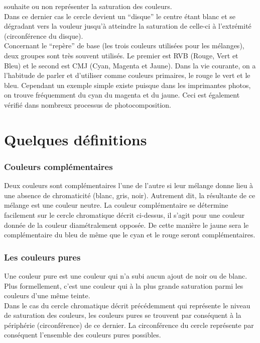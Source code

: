 \documentclass[french,a4paper]{report}
\begin{document}
{souhaite ou non représenter la saturation des
couleurs.\\
Dans ce dernier cas le cercle devient un \enquote{disque} le centre étant
blanc et se dégradant vers la vouleur jusqu'à atteindre la saturation
de celle-ci à l'extrémité (circonférence du
disque).\\
Concernant le \enquote{repère} de base (les trois couleurs utilisées
pour les mélanges), deux groupes sont très souvent utilisés. Le
premier est RVB (Rouge, Vert et Bleu) et le second est CMJ (Cyan,
Magenta et Jaune). Dans la vie courante, on a l'habitude de parler et
d'utiliser comme couleurs primaires, le rouge le vert et le bleu.
Cependant un exemple simple existe puisque dans les imprimantes
photos, on trouve fréquemment du cyan du magenta et du
jaune. Ceci est également vérifié dans nombreux processus de photocomposition.
\section{Quelques définitions}
\subsubsection{Couleurs complémentaires}
Deux couleurs sont complémentaires l'une de l'autre si leur mélange
donne lieu à une absence de chromaticité (blanc, gris,
noir). Autrement dit, la résultante de ce mélange est une couleur
neutre. La couleur complémentaire se détermine facilement sur le
cercle chromatique décrit ci-dessus, il s'agit pour une couleur donnée
de la couleur diamétralement opposée. De cette manière le jaune sera
le complémentaire du bleu de même que le cyan et le rouge seront
complémentaires.
\\
\subsubsection{Les couleurs pures}
Une couleur pure est une couleur qui n'a subi aucun ajout de noir ou
de blanc. Plus formellement, c'est une couleur qui à la plus grande
saturation parmi les couleurs d'une même teinte.\\
Dans le cas du cercle chromatique décrit précédemment qui représente
le niveau de saturation des couleurs, les couleurs pures se trouvent
par conséquent à la périphérie (circonférence) de ce dernier. La
circonférence du cercle représente par conséquent l'ensemble des
couleurs pures possibles.
\newpage
}
\end{document}
